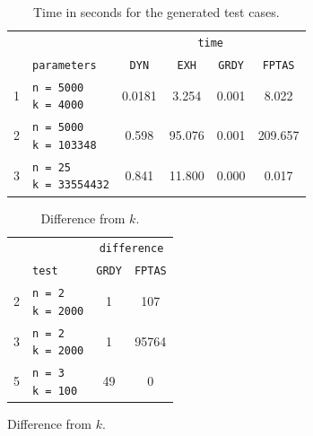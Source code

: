 \documentclass[11pt]{article}
\begin{document}
\begin{figure}[!hbpt]
    \begin{minipage}{0.6\textwidth}
        \begin{table}[H]
            \centering
            \begin{tabular}{|c|l|c|c|c|c|} \hline
                \cellcolor{blue!20} & \cellcolor{blue!20} &  \multicolumn{4}{c|}{\cellcolor{blue!20}\texttt{time}} \\ \cline{3-6} 
                \cellcolor{blue!20} & \cellcolor{blue!20}\texttt{parameters} & \texttt{DYN} & \texttt{EXH} & \texttt{GRDY} & \texttt{FPTAS} \\ \hline
                1 & \makecell[l]{ \texttt{n = 5000} \\ \texttt{k = 4000}} & 0.0181 & 3.254 & 0.001 & 8.022 \\ \hline
                2 & \makecell[l]{ \texttt{n = 5000} \\ \texttt{k = 103348}} & 0.598 & 95.076 & 0.001 & 209.657 \\ \hline
                3 & \makecell[l]{ \texttt{n = 25} \\ \texttt{k = 33554432}} & 0.841 & 11.800 & 0.000 & 0.017 \\ \hline
            \end{tabular}
            \caption{Time in seconds for the generated test cases.}
        \end{table} 
    \end{minipage}
    \begin{minipage}{0.39\textwidth}
        \begin{table}[H]
            \centering
            \begin{tabular}{|c|l|c|c|} \hline
                \cellcolor{blue!20} & \cellcolor{blue!20} & \multicolumn{2}{c|}{\cellcolor{blue!20}\texttt{difference}} \\ \cline{3-4}
                \cellcolor{blue!20} & \cellcolor{blue!20} \texttt{test} & \texttt{GRDY} & \texttt{FPTAS} \\ \hline
                2 & \makecell[l]{ \texttt{n = 2} \\ \texttt{k = 2000}} & 1 & 107 \\ \hline
                3 & \makecell[l]{ \texttt{n = 2} \\ \texttt{k = 2000}} & 1 & 95764 \\ \hline
                5 & \makecell[l]{ \texttt{n = 3} \\ \texttt{k = 100}} & 49 & 0 \\ \hline
            \end{tabular}
            \caption{Difference from $k$.}
        \end{table} 
    \end{minipage}
\end{figure}
\end{document}
